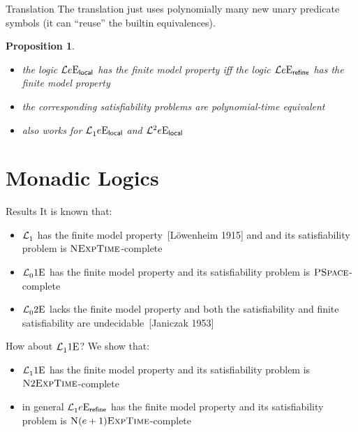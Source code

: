 \documentclass{beamer}
\newtheorem{proposition}{Proposition}
\begin{document}
\begin{frame}{Translation}
The translation just uses polynomially many new unary predicate symbols (it can
``reuse'' the builtin equivalences).
\begin{proposition}
\begin{itemize}
  \item
  the logic $\mathcal{L}{e}\mathrm{E}_{\mathsf{local}}$ has the finite model property iff
  the logic $\mathcal{L}{e}\mathrm{E}_{\mathsf{refine}}$ has the finite model property
  
  \item
  the corresponding satisfiability problems are polynomial-time equivalent
  
  \item
  also works for $\mathcal{L}^{{}}_{1}{e}\mathrm{E}_{\mathsf{local}}$ and
  $\mathcal{L}^{2}_{{}}{e}\mathrm{E}_{\mathsf{local}}$
\end{itemize}
\end{proposition}
\end{frame}

\section{Monadic Logics}
\begin{frame}{Results}
It is known that:
\begin{itemize}
  \item
  $\mathcal{L}^{{}}_{1}$ has the finite model property~{[L{\"o}wenheim 1915]} and
  and its satisfiability problem is $\text{\normalfont{\scshape NExpTime}}$-complete
  
  \item
  $\mathcal{L}^{{}}_{0}{1}\mathrm{E}_{{}}$ has the finite model property and
  its satisfiability problem is $\text{\normalfont{\scshape PSpace}}$-complete
  
  \item
  $\mathcal{L}^{{}}_{0}{2}\mathrm{E}_{{}}$ lacks the finite model property
  and both the satisfiability and finite satisfiability are
  undecidable~{[Janiczak 1953]}
\end{itemize}

\pause
How about $\mathcal{L}^{{}}_{1}{1}\mathrm{E}_{{}}$?
\pause
We show that:
\begin{itemize}
  \item
  $\mathcal{L}^{{}}_{1}{1}\mathrm{E}_{{}}$ has the finite model property and its
  satisfiability problem is $\text{\normalfont{\scshape N}}2\text{\normalfont{\scshape ExpTime}}$-complete
  
  \item
  in general $\mathcal{L}^{{}}_{1}{e}\mathrm{E}_{\mathsf{refine}}$ has the finite model property and
  its satisfiability problem is $\text{\normalfont{\scshape N}}(e+1)\text{\normalfont{\scshape ExpTime}}$-complete
\end{itemize}
\end{frame}
\end{document}
